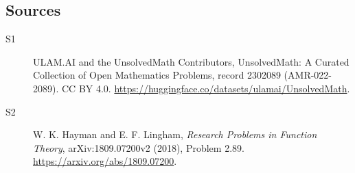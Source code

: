 \documentclass[11pt]{article}
\begin{document}
\subsection{Sources}
\begin{description}
\item[\hypertarget{source:2302089:1}{S1}] ULAM.AI and the UnsolvedMath Contributors, UnsolvedMath: A Curated Collection of Open Mathematics Problems, record 2302089 (AMR-022-2089). CC BY 4.0. \url{https://huggingface.co/datasets/ulamai/UnsolvedMath}.
\item[\hypertarget{source:2302089:2}{S2}] W. K. Hayman and E. F. Lingham, \emph{Research Problems in Function Theory}, arXiv:1809.07200v2 (2018), Problem 2.89. \url{https://arxiv.org/abs/1809.07200}.
\end{description}
\label{end:2302089}
\end{document}
